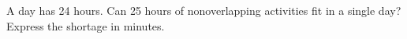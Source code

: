 A day has 24 hours. Can 25 hours of nonoverlapping activities fit in a single day? Express the shortage in minutes.
